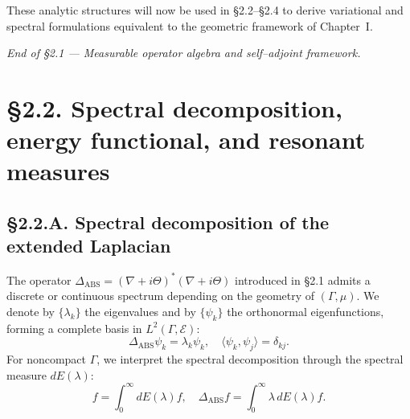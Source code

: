 These analytic structures will now be used in §2.2–§2.4 to derive variational and spectral formulations equivalent to the geometric framework of Chapter~I.

\begin{center}
\textit{End of §2.1 — Measurable operator algebra and self–adjoint framework.}
\end{center}


\section{§2.2. Spectral decomposition, energy functional, and resonant measures}
\label{sec:2.2-spectral}

\subsection*{§2.2.A. Spectral decomposition of the extended Laplacian}

The operator $\Delta_{\mathrm{ABS}}=(\nabla+i\Theta)^\ast(\nabla+i\Theta)$ introduced in §2.1 admits a discrete or continuous spectrum depending on the geometry of $(\Gamma,\mu)$.  
We denote by $\{\lambda_k\}$ the eigenvalues and by $\{\psi_k\}$ the orthonormal eigenfunctions, forming a complete basis in $L^2(\Gamma,\mathcal E)$:
\[
\Delta_{\mathrm{ABS}}\psi_k = \lambda_k\psi_k, 
\quad 
\langle \psi_k,\psi_j\rangle=\delta_{kj}.
\]
For noncompact $\Gamma$, we interpret the spectral decomposition through the spectral measure $dE(\lambda)$:
\[
f=\int_0^\infty dE(\lambda)f,\quad
\Delta_{\mathrm{ABS}}f = \int_0^\infty \lambda\, dE(\lambda)f.
\]

